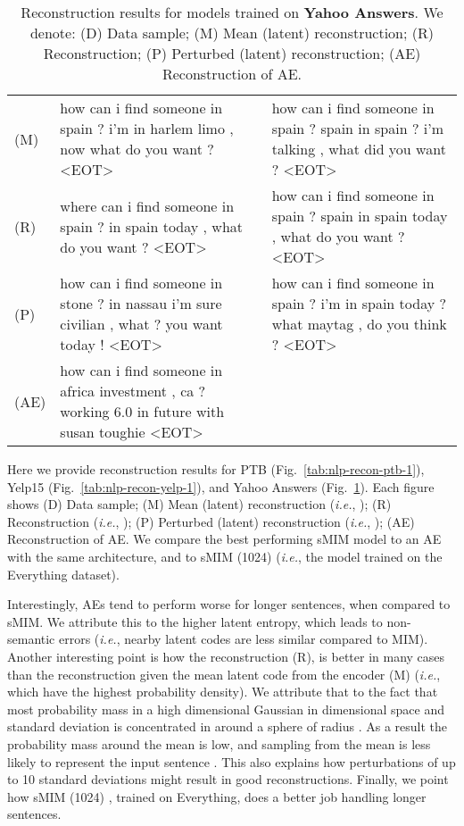 \documentclass{article}
\newcommand{\ie}{{\em i.e.}}
\begin{document}
\begin{table}[th]
{\begin{tabular}{l| p{8cm}|p{8cm} }
        \hline 
\hdashline[1pt/1pt]
(M) & how can i find someone in spain ? i'm in harlem limo , now what do you want ? \textsc{<EOT>} & how can i find someone in spain ? spain in spain ? i'm talking , what did you want ? \textsc{<EOT>} \\
\hdashline[1pt/1pt]
(R) & where can i find someone in spain ? in spain today , what do you want ? \textsc{<EOT>} & how can i find someone in spain ? spain in spain today , what do you want ? \textsc{<EOT>} \\
\hdashline[1pt/1pt]
(P) & how can i find someone in stone ? in nassau i'm sure civilian , what ? you want today ! \textsc{<EOT>} & how can i find someone in spain ? i'm in spain today ? what maytag , do you think ? \textsc{<EOT>} \\
\hdashline[1pt/1pt]
(AE) & how can i find someone in africa investment , ca ? working 6.0 in future with susan toughie \textsc{<EOT>} &  \\
    \end{tabular}
    }
    \caption{
    Reconstruction results for models trained on \textbf{Yahoo Answers}.
    We denote:
    (D) Data sample; 
    (M) Mean (latent) reconstruction;
    (R) Reconstruction;
    (P) Perturbed (latent) reconstruction;
    (AE) Reconstruction of AE.
    }
    \label{tab:nlp-recon-yahoo-1}
\end{table}


Here we provide reconstruction results for PTB (Fig.\ \ref{tab:nlp-recon-ptb-1}),
Yelp15 (Fig.\ \ref{tab:nlp-recon-yelp-1}), and Yahoo Answers (Fig.\ \ref{tab:nlp-recon-yahoo-1}).
Each figure shows (D) Data sample; 
(M) Mean (latent) reconstruction (\ie, );
(R) Reconstruction (\ie, );
(P) Perturbed (latent) reconstruction (\ie, );
(AE) Reconstruction of AE.
We compare the best performing sMIM model to an AE with the same architecture, and to sMIM (1024) \textsuperscript{\textdagger}
(\ie, the model trained on the Everything dataset). 

Interestingly, AEs tend to perform worse for longer sentences, when compared to sMIM.
We attribute this to the higher latent entropy, which leads to non-semantic errors 
(\ie, nearby latent codes are less similar compared to MIM).
Another interesting point is how the reconstruction (R), is better in many cases than 
the reconstruction given the mean latent code from the encoder (M) (\ie, which have the highest probability density).
We attribute that to the fact that most probability mass in a high dimensional Gaussian in  dimensional space and  standard deviation is concentrated in around a sphere of radius . 
As a result the probability mass around the mean is low, and sampling from the mean is less likely to represent the input sentence .
This also explains how perturbations of up to 10 standard deviations might result in good reconstructions.
Finally, we point how sMIM (1024) \textsuperscript{\textdagger}, trained on Everything, does a better job handling longer sentences.
\end{document}
